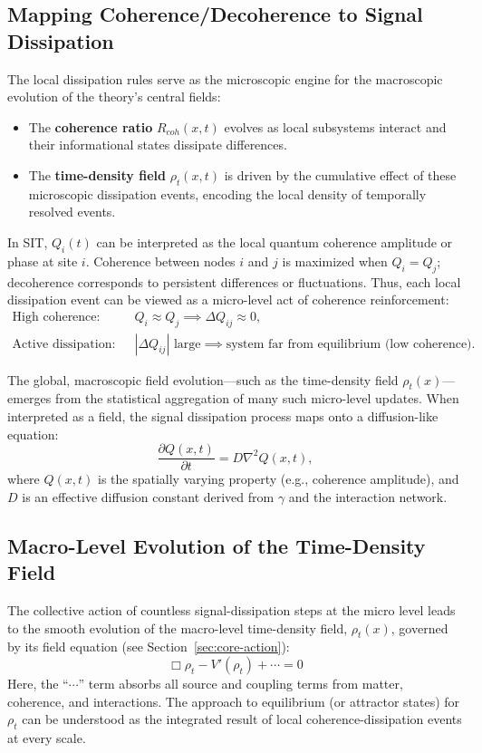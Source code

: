 \documentclass[american,11pt,letterpaper]{article}
\def\mathrm#1{#1}%
\begin{document}
\subsection{Mapping Coherence/Decoherence to Signal Dissipation}

The local dissipation rules serve as the microscopic engine for the macroscopic evolution of the theory's central fields:
\begin{itemize}
    \item The \textbf{coherence ratio} $R_{\mathrm{coh}}(x,t)$ evolves as local subsystems interact and their informational states dissipate differences.
\item The \textbf{time-density field} $\rho_t(x,t)$ is driven by the cumulative effect of these microscopic dissipation events, encoding the local density of temporally resolved events.
\end{itemize}

In SIT, $Q_i(t)$ can be interpreted as the local quantum coherence amplitude or phase at site $i$.
Coherence between nodes $i$ and $j$ is maximized when $Q_i = Q_j$; decoherence corresponds to persistent differences or fluctuations.
Thus, each local dissipation event can be viewed as a micro-level act of coherence reinforcement:
\begin{align}
\text{High coherence:}\quad & Q_i \approx Q_j \implies \Delta Q_{ij} \approx 0,\\
\text{Active dissipation:}\quad & |\Delta Q_{ij}| \text{ large} \implies \text{system far from equilibrium (low coherence)}.
\end{align}

The global, macroscopic field evolution---such as the time-density field $\rho_t(x)$---emerges from the statistical aggregation of many such micro-level updates.
When interpreted as a field, the signal dissipation process maps onto a diffusion-like equation:
\begin{equation}
\frac{\partial Q(x,t)}{\partial t} = D \nabla^2 Q(x,t),
\label{eq:dissipation}
\end{equation}
where $Q(x,t)$ is the spatially varying property (e.g., coherence amplitude), and $D$ is an effective diffusion constant derived from $\gamma$ and the interaction network.
\subsection{Macro-Level Evolution of the Time-Density Field}

The collective action of countless signal-dissipation steps at the micro level leads to the smooth evolution of the macro-level time-density field, $\rho_t(x)$, governed by its field equation (see Section~\ref{sec:core-action}):
\[
\Box \rho_t - V'(\rho_t) + \cdots = 0
\]
Here, the ``$\cdots$'' term absorbs all source and coupling terms from matter, coherence, and interactions.
The approach to equilibrium (or attractor states) for $\rho_t$ can be understood as the integrated result of local coherence-dissipation events at every scale.
\end{document}

